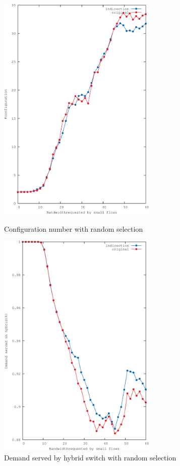 \begin{figure}
	\centering
	\begin{minipage}{3in}%
		\includegraphics[width=3in]{figures/ndayRandom}
		\caption{Configuration number with random selection}
		\label{fig:ndayRandom}
	\end{minipage}%
	\qquad
	\begin{minipage}{3in}%
		\includegraphics[width=3in]{figures/ndem3Random}
		\caption{Demand served by hybrid switch with random selection}
		\label{fig:ndem3Random}
	\end{minipage}%
\end{figure}

